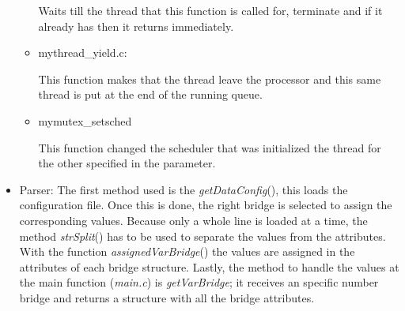 \documentclass[a4paper,9pt]{article}
\begin{document}
\begin{itemize}
\begin{itemize}
Waits till the thread that this function is called for, terminate and if it already has then it returns immediately.

\item mythread\_yield.c:

This function makes that the thread leave the processor and this same thread is put at the end of the running queue. 

\item mymutex\_setsched

This function changed the scheduler that  was initialized the thread for the other specified in the parameter.

\end{itemize}

\item Parser: The first method used is the \emph{getDataConfig}(), this loads the configuration file. Once this is done, the right bridge is selected to assign the corresponding values. Because only a whole line is loaded at a time, the method \emph{strSplit}() has to be used to separate the values from the attributes. With the function \emph{assignedVarBridge}() the values are assigned in the attributes of each bridge structure. Lastly, the method to handle the values at the main function (\emph{main.c}) is \emph{getVarBridge}; it receives an specific number bridge and returns a structure with all the bridge attributes. 


\end{itemize}
\end{document}
